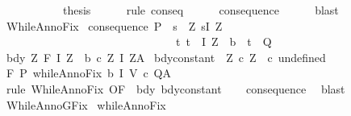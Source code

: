 \begin{isabellebody}
\ \ \ \ \isamarkupfalse%
\isanewline
\ \ \isamarkupfalse%
\isanewline
\ \ \isamarkupfalse%
\ {\isacharquery}thesis\isanewline
\ \ \ \ \isamarkupfalse%
\ {\isacharparenleft}rule\ conseq{\isacharparenright}\isanewline
\ \ \ \ \isamarkupfalse%
\ consequence\isanewline
\ \ \ \ \isamarkupfalse%
\ blast\isanewline
{}\isamarkupfalse%
%
\endisatagproof
{\isafoldproof}%
%
\isadelimproof
\isanewline
%
\endisadelimproof
\ \ \ \isanewline
{}\isamarkupfalse%
\ WhileAnnoFix{\isacharprime}{\isacharcolon}\isanewline
{}\ consequence{\isacharcolon}\ {\isachardoublequoteopen}P\ {\isasymsubseteq}\ {\isacharbraceleft}s{\isachardot}\ {\isacharparenleft}{\isasymexists}\ Z{\isachardot}\ s{\isasymin}I\ Z\ {\isasymand}\ \isanewline
\ \ \ \ \ \ \ \ \ \ \ \ \ \ \ \ \ \ \ \ \ \ \ \ \ \ \ \ \ \ \ {\isacharparenleft}{\isasymforall}t{\isachardot}\ t\ {\isasymin}\ I\ Z\ {\isasyminter}\ {\isacharminus}b\ {\isasymlongrightarrow}\ t\ {\isasymin}\ Q{\isacharparenright}{\isacharparenright}\ {\isacharbraceright}{\isachardoublequoteclose}\isanewline
{}\ bdy{\isacharcolon}\ {\isachardoublequoteopen}{\isasymforall}Z{\isachardot}\ {\isasymGamma}{\isacharcomma}{\isasymTheta}{\isasymturnstile}\isactrlbsub {\isacharslash}F\isactrlesub \ {\isacharparenleft}I\ Z\ {\isasyminter}\ b{\isacharparenright}\ {\isacharparenleft}c\ Z{\isacharparenright}\ {\isacharparenleft}I\ Z{\isacharparenright}{\isacharcomma}A{\isachardoublequoteclose}\isanewline
{}\ bdy{\isacharunderscore}constant{\isacharcolon}\ \ {\isachardoublequoteopen}{\isasymforall}Z{\isachardot}\ c\ Z\ {\isacharequal}\ c\ undefined{\isachardoublequoteclose}\isanewline
{}\ {\isachardoublequoteopen}{\isasymGamma}{\isacharcomma}{\isasymTheta}{\isasymturnstile}\isactrlbsub {\isacharslash}F\isactrlesub \ P\ {\isacharparenleft}whileAnnoFix\ b\ I\ V\ c{\isacharparenright}\ Q{\isacharcomma}A{\isachardoublequoteclose}\isanewline
%
\isadelimproof
\ \ %
\endisadelimproof
%
\isatagproof
{}\isamarkupfalse%
\ {\isacharparenleft}rule\ WhileAnnoFix\ {\isacharbrackleft}OF\ {\isacharunderscore}\ bdy\ bdy{\isacharunderscore}constant{\isacharbrackright}{\isacharparenright}\isanewline
\ \ \isamarkupfalse%
\ consequence\ \isamarkupfalse%
\ blast%
\endisatagproof
{\isafoldproof}%
%
\isadelimproof
\isanewline
%
\endisadelimproof
\isanewline
{}\isamarkupfalse%
\ WhileAnnoGFix{\isacharcolon}\isanewline
{}\ whileAnnoFix{\isacharcolon}\isanewline

\end{isabellebody}
